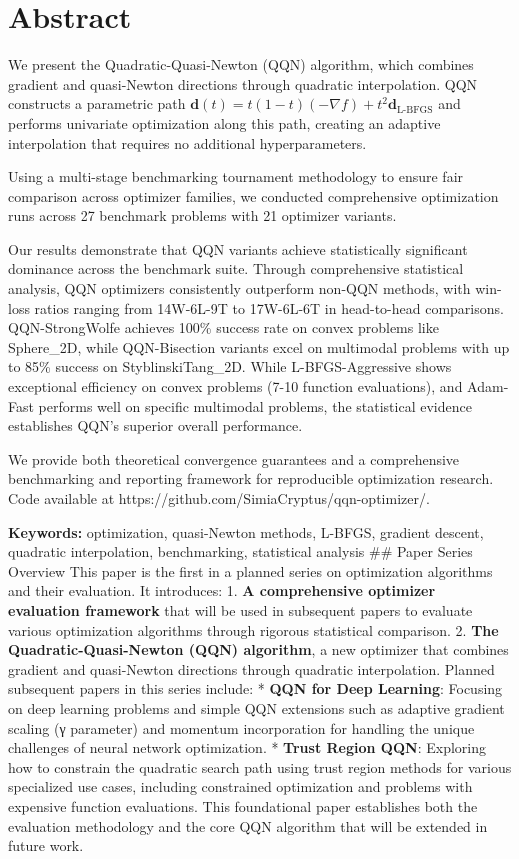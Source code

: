 \hypertarget{abstract}{%
\section{Abstract}\label{abstract}}

We present the Quadratic-Quasi-Newton (QQN) algorithm, which combines gradient and quasi-Newton directions through quadratic interpolation.
QQN constructs a parametric path \(\mathbf{d}(t) = t(1-t)(-\nabla f) + t^2 \mathbf{d}_{\text{L-BFGS}}\) and performs univariate optimization along this path, creating an adaptive interpolation that requires no additional hyperparameters.

Using a multi-stage benchmarking tournament methodology to ensure fair comparison across optimizer families, we conducted comprehensive optimization runs across 27 benchmark problems with 21 optimizer variants.

Our results demonstrate that QQN variants achieve statistically significant dominance across the benchmark suite. Through comprehensive statistical analysis, QQN optimizers consistently outperform non-QQN methods, with win-loss ratios ranging from 14W-6L-9T to 17W-6L-6T in head-to-head comparisons. QQN-StrongWolfe achieves 100\% success rate on convex problems like Sphere\_2D, while QQN-Bisection variants excel on multimodal problems with up to 85\% success on StyblinskiTang\_2D. While L-BFGS-Aggressive shows exceptional efficiency on convex problems (7-10 function evaluations), and Adam-Fast performs well on specific multimodal problems, the statistical evidence establishes QQN's superior overall performance.

We provide both theoretical convergence guarantees and a comprehensive benchmarking and reporting framework for reproducible optimization research.
Code available at https://github.com/SimiaCryptus/qqn-optimizer/.

\textbf{Keywords:} optimization, quasi-Newton methods, L-BFGS, gradient descent, quadratic interpolation, benchmarking, statistical analysis
\#\# Paper Series Overview
This paper is the first in a planned series on optimization algorithms and their evaluation. It introduces:
1. \textbf{A comprehensive optimizer evaluation framework} that will be used in subsequent papers to evaluate various optimization algorithms through rigorous statistical comparison.
2. \textbf{The Quadratic-Quasi-Newton (QQN) algorithm}, a new optimizer that combines gradient and quasi-Newton directions through quadratic interpolation.
Planned subsequent papers in this series include:
* \textbf{QQN for Deep Learning}: Focusing on deep learning problems and simple QQN extensions such as adaptive gradient scaling (γ parameter) and momentum incorporation for handling the unique challenges of neural network optimization.
* \textbf{Trust Region QQN}: Exploring how to constrain the quadratic search path using trust region methods for various specialized use cases, including constrained optimization and problems with expensive function evaluations.
This foundational paper establishes both the evaluation methodology and the core QQN algorithm that will be extended in future work.

